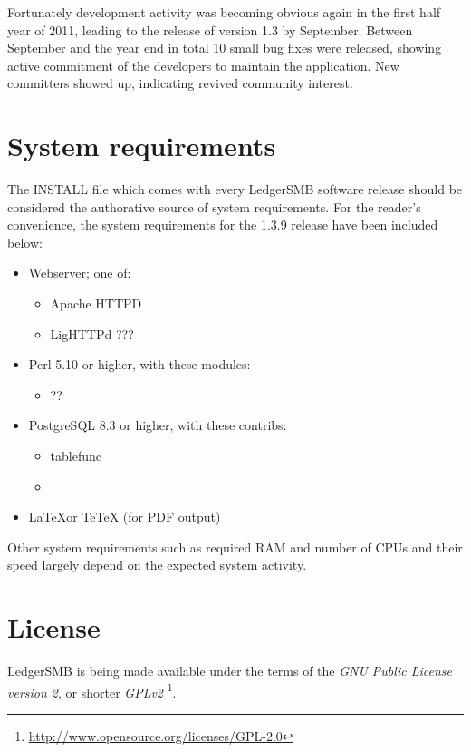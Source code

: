 Fortunately development activity was becoming obvious again in the first half 
year of 2011,
leading to the release of version 1.3 by September.  Between September and the
year end in total 10 small bug fixes were released, showing active commitment
of the developers to maintain the application.  New committers showed up, indicating
revived community interest.



\section{System requirements}

The INSTALL file which comes with every LedgerSMB software release should be
considered the authorative source of system requirements.  For the reader's
convenience, the system requirements for the 1.3.9 release have been included
below:

\begin{itemize}
\item Webserver; one of:
\begin{itemize}
\item Apache HTTPD %
\item LigHTTPd ???
\end{itemize}
\item Perl 5.10 or higher, with these modules: 
\begin{itemize}
\item ??
\end{itemize}
\item PostgreSQL 8.3 or higher, with these contribs:
\begin{itemize}
\item tablefunc
\item 
\end{itemize}
\item \LaTeX or TeTeX (for PDF output)
\end{itemize}

Other system requirements such as required RAM and number of CPUs and their speed
largely depend on the expected system activity.

\section{License}

LedgerSMB is being made available under the terms of the
\textit{GNU Public License version 2}, or shorter \textit{GPLv2}
\footnote{\url{http://www.opensource.org/licenses/GPL-2.0}}.

